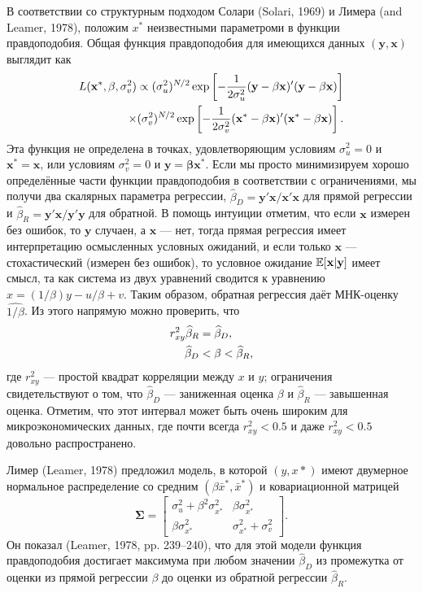 В соответствии со структурным подходом Солари (Solari, 1969) и Лимера (and Leamer, 1978), положим $x^*$ неизвестными параметроми в функции правдоподобия. Общая функция правдоподобия для имеющихся данных $(\mathbf{y}, \mathbf{x})$ выглядит как
\begin{align}
L(\mathbf{x^*}, \beta, \sigma^2_v)\propto ( \sigma^2_u)^{N/2} \exp \left[ -\frac{1}{2\sigma^2_u}(\mathbf{y-\beta x})'(\mathbf{y-\beta x}) \right] \notag \\
\times ( \sigma^2_v)^{N/2} \exp \left[ -\frac{1}{2\sigma^2_v}(\mathbf{x^*-\beta x})'(\mathbf{x^*-\beta x}) \right].
\end{align}
Эта функция не определена в точках, удовлетворяющим условиям $\sigma^2_u=0$ и $\mathbf{x^*}=\mathbf{x}$, или условиям $\sigma^2_v=0$ и $\mathbf{y}=\mathbf{\beta x^*}$. Если мы просто минимизируем хорошо определённые части функции правдоподобия в соответствии с ограничениями, мы получи два скалярных параметра регрессии, $\widehat{\beta}_D=\mathbf{y'x/x'x}$ для прямой регрессии и $\widehat{\beta}_R=\mathbf{y'x/y'y}$ для обратной. В помощь интуиции отметим, что если $\mathbf{x}$ измерен без ошибок, то $\mathbf{y}$ случаен, а $\mathbf{x}$ --- нет, тогда прямая регрессия имеет интерпретацию осмысленных условных ожиданий, и если только $\mathbf{x}$ --- стохастический (измерен без ошибок), то условное ожидание $\mathbb{E}[\mathbf{x|y}]$ имеет смысл, та как система из двух уравнений сводится к уравнению $x=(1/\beta)y-u/\beta+v$. Таким образом, обратная регрессия даёт МНК-оценку $\widehat{1/\beta}$. Из этого напрямую можно проверить, что
\begin{align}
r^2_{xy} \widehat{\beta}_R&=\widehat{\beta}_D, \\
\widehat{\beta}_D &< \beta < \widehat{\beta}_R, \notag
\end{align}
где $r^2_{xy}$ --- простой квадрат корреляции между $x$ и $y$; ограничения свидетельствуют о том, что $\widehat{\beta}_D$ --- заниженная оценка $\beta$ и $\widehat{\beta}_R$ --- завышенная оценка. Отметим, что этот интервал может быть очень широким для микроэкономических данных, где почти всегда $r^2_{xy}<0.5$ и даже $r^2_{xy}<0.5$ довольно распространено.

Лимер (Leamer, 1978) предложил модель, в которой $(y, x*)$ имеют двумерное нормальное распределение со средним $(\beta \bar{x}^*, \bar{x}^*)$ и ковариационной матрицей 
\begin{equation}
\mathbf{\Sigma}=
\begin{bmatrix}
\sigma^2_u+\beta^2\sigma^2_{x^*} & \beta\sigma^2_{x^*} \\ \beta\sigma^2_{x^*} & \sigma^2_{x^*}+\sigma^2_v
\end{bmatrix} .
\end{equation}
Он показал (Leamer, 1978, pp. 239--240), что для этой модели функция правдоподобия достигает максимума при любом значении $\widehat{\beta}_D$ из промежутка от оценки из прямой регрессии $\beta$ до оценки из обратной регрессии $\widehat{\beta}_R$.

